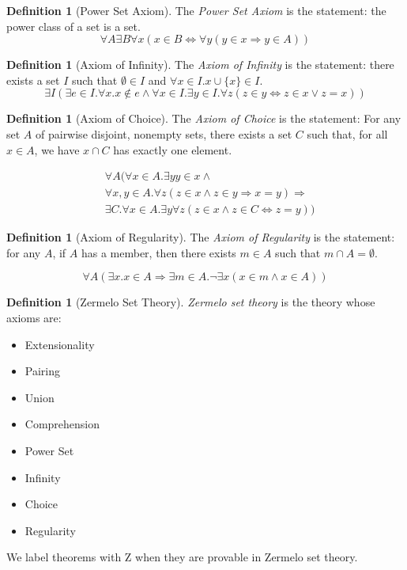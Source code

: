 \documentclass{book}
\theoremstyle{definition}
\newtheorem{df}[ax]{Definition}
\begin{document}
\begin{df}[Power Set Axiom]
The \emph{Power Set Axiom} is the statement: the power class of a set is a set.
\[ \forall A \exists B \forall x (x \in B \Leftrightarrow \forall y (y \in x \Rightarrow y \in A)) \]
\end{df}

\begin{df}[Axiom of Infinity]
The \emph{Axiom of Infinity} is the statement: there exists a set $I$ such that $\emptyset \in I$ and $\forall x \in I. x \cup \{x\} \in I$.
\[ \exists I (\exists e \in I. \forall x. x \notin e \wedge \forall x \in I. \exists y \in I. \forall z (z \in y \Leftrightarrow z \in x \vee z = x)) \]
\end{df}

\begin{df}[Axiom of Choice]
The \emph{Axiom of Choice} is the statement: 
For any set $A$ of pairwise disjoint, nonempty sets, there exists a set $C$ such that, for all $x \in A$, we have $x \cap C$ has exactly one element.

\begin{align*}
& \forall A ( \forall x \in A. \exists y y \in x \wedge \\
& \forall x,y \in A. \forall z(z \in x \wedge z \in y \Rightarrow x = y) \Rightarrow \\
& \exists C. \forall x \in A. \exists y \forall z (z \in x \wedge z \in C \Leftrightarrow z = y))
\end{align*}
\end{df}

\begin{df}[Axiom of Regularity]
The \emph{Axiom of Regularity} is the statement:
for any $A$, if $A$ has a member, then there exists $m \in A$ such that $m \cap A = \emptyset$.

\[ \forall A (\exists x. x \in A \Rightarrow \exists m \in A. \neg \exists x (x \in m \wedge x \in A)) \]
\end{df}

\begin{df}[Zermelo Set Theory]
\emph{Zermelo set theory} is the theory whose axioms are:
\begin{itemize}
\item Extensionality
\item Pairing
\item Union
\item Comprehension
\item Power Set
\item Infinity
\item Choice
\item Regularity
\end{itemize}
We label theorems with Z when they are provable in Zermelo set theory.
\end{df}
\end{document}

